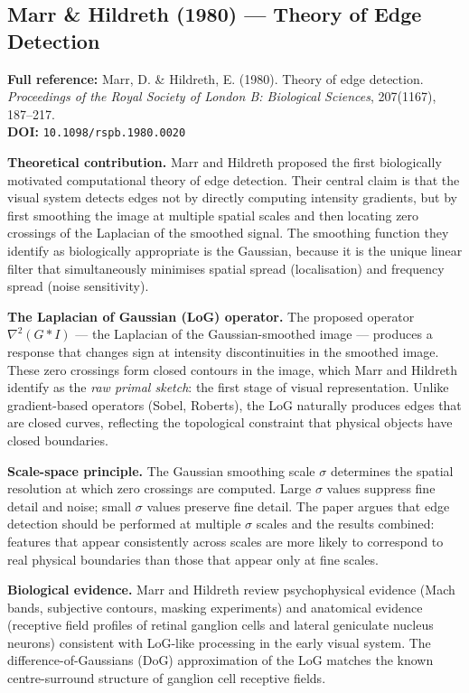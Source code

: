 \documentclass[11pt, a4paper]{article}
\begin{document}
\vspace{8pt}
\subsection{Marr \& Hildreth (1980) --- Theory of Edge Detection}

\begin{refbox}
\textbf{Full reference:} Marr, D. \& Hildreth, E. (1980). Theory of edge detection. \textit{Proceedings of the Royal Society of London B: Biological Sciences}, 207(1167), 187--217.\\[4pt]
\textbf{DOI:} \texttt{10.1098/rspb.1980.0020}
\end{refbox}

\textbf{Theoretical contribution.} Marr and Hildreth proposed the first biologically motivated computational theory of edge detection. Their central claim is that the visual system detects edges not by directly computing intensity gradients, but by first smoothing the image at multiple spatial scales and then locating zero crossings of the Laplacian of the smoothed signal. The smoothing function they identify as biologically appropriate is the Gaussian, because it is the unique linear filter that simultaneously minimises spatial spread (localisation) and frequency spread (noise sensitivity).

\textbf{The Laplacian of Gaussian (LoG) operator.} The proposed operator $\nabla^2(G * I)$ --- the Laplacian of the Gaussian-smoothed image --- produces a response that changes sign at intensity discontinuities in the smoothed image. These zero crossings form closed contours in the image, which Marr and Hildreth identify as the \textit{raw primal sketch}: the first stage of visual representation. Unlike gradient-based operators (Sobel, Roberts), the LoG naturally produces edges that are closed curves, reflecting the topological constraint that physical objects have closed boundaries.

\textbf{Scale-space principle.} The Gaussian smoothing scale $\sigma$ determines the spatial resolution at which zero crossings are computed. Large $\sigma$ values suppress fine detail and noise; small $\sigma$ values preserve fine detail. The paper argues that edge detection should be performed at multiple $\sigma$ scales and the results combined: features that appear consistently across scales are more likely to correspond to real physical boundaries than those that appear only at fine scales.

\textbf{Biological evidence.} Marr and Hildreth review psychophysical evidence (Mach bands, subjective contours, masking experiments) and anatomical evidence (receptive field profiles of retinal ganglion cells and lateral geniculate nucleus neurons) consistent with LoG-like processing in the early visual system. The difference-of-Gaussians (DoG) approximation of the LoG matches the known centre-surround structure of ganglion cell receptive fields.
\end{document}
